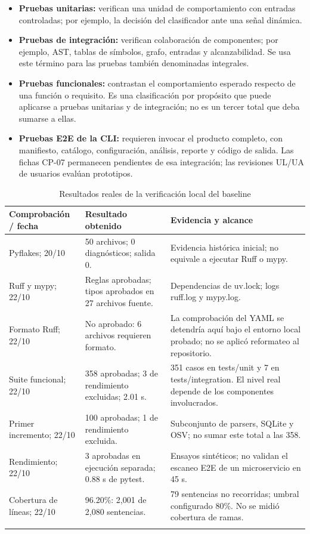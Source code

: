 \begin{itemize}[leftmargin=*]
\item \textbf{Pruebas unitarias:} verifican una unidad de comportamiento con entradas controladas; por ejemplo, la decisión del clasificador ante una señal dinámica.
\item \textbf{Pruebas de integración:} verifican colaboración de componentes; por ejemplo, AST, tablas de símbolos, grafo, entradas y alcanzabilidad. Se usa este término para las pruebas también denominadas integrales.
\item \textbf{Pruebas funcionales:} contrastan el comportamiento esperado respecto de una función o requisito. Es una clasificación por propósito que puede aplicarse a pruebas unitarias y de integración; no es un tercer total que deba sumarse a ellas.
\item \textbf{Pruebas E2E de la CLI:} requieren invocar el producto completo, con manifiesto, catálogo, configuración, análisis, reporte y código de salida. Las fichas CP-07 permanecen pendientes de esa integración; las revisiones UL/UA de usuarios evalúan prototipos.
\end{itemize}
\begin{table}[H]
\centering\small{}
\caption{Resultados reales de la verificación local del baseline}
\label{p8:tab:p8_resultados}
\begin{tabularx}{\textwidth}{P{3cm}YY}
\toprule
\textbf{Comprobación / fecha} & \textbf{Resultado obtenido} & \textbf{Evidencia y alcance} \\
\midrule
Pyflakes; 20/10 & 50 archivos; 0 diagnósticos; salida 0. & Evidencia histórica inicial; no equivale a ejecutar Ruff o mypy. \\
\addlinespace
Ruff y mypy; 22/10 & Reglas aprobadas; tipos aprobados en 27 archivos fuente. & Dependencias de uv.lock; logs ruff.log y mypy.log. \\
\addlinespace
Formato Ruff; 22/10 & No aprobado: 6 archivos requieren formato. & La comprobación del YAML se detendría aquí bajo el entorno local probado; no se aplicó reformateo al repositorio. \\
\addlinespace
Suite funcional; 22/10 & 358 aprobadas; 3 de rendimiento excluidas; 2.01 s. & 351 casos en tests/unit y 7 en tests/integration. El nivel real depende de los componentes involucrados. \\
\addlinespace
Primer incremento; 22/10 & 100 aprobadas; 1 de rendimiento excluida. & Subconjunto de parsers, SQLite y OSV; no sumar este total a las 358. \\
\addlinespace
Rendimiento; 22/10 & 3 aprobadas en ejecución separada; 0.88 s de pytest. & Ensayos sintéticos; no validan el escaneo E2E de un microservicio en 45 s. \\
\addlinespace
Cobertura de líneas; 22/10 & 96.20\%: 2,001 de 2,080 sentencias. & 79 sentencias no recorridas; umbral configurado 80\%. No se midió cobertura de ramas. \\
\addlinespace
\bottomrule
\end{tabularx}
\end{table}

